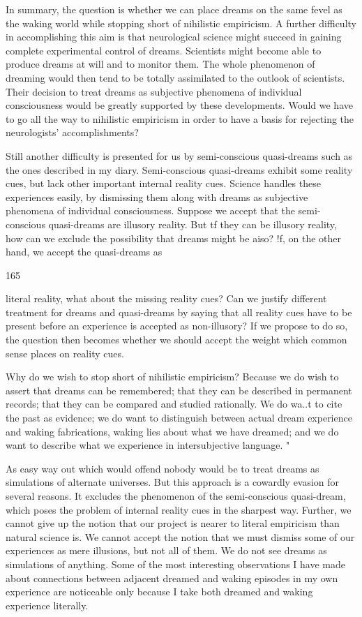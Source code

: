 \documentclass[10pt,twoside]{memoir}
\begin{document}
\begin{enumerate}
{{In summary, the question is whether we can place dreams on the same 
fevel as the waking world while stopping short of nihilistic empiricism. A 
further difficulty in accomplishing this aim is that neurological science might 
succeed in gaining complete experimental control of dreams. Scientists might 
become able to produce dreams at will and to monitor them. The whole 
phenomenon of dreaming would then tend to be totally assimilated to the 
outlook of scientists. Their decision to treat dreams as subjective phenomena 
of individual consciousness would be greatly supported by these 
developments. Would we have to go all the way to nihilistic empiricism in 
order to have a basis for rejecting the neurologists' accomplishments? 

Still another difficulty is presented for us by semi-conscious 
quasi-dreams such as the ones described in my diary. Semi-conscious 
quasi-dreams exhibit some reality cues, but lack other important internal 
reality cues. Science handles these experiences easily, by dismissing them 
along with dreams as subjective phenomena of individual consciousness. 
Suppose we accept that the semi-conscious quasi-dreams are illusory reality. 
But tf they can be illusory reality, how can we exclude the possibility that 
dreams might be aiso? !f, on the other hand, we accept the quasi-dreams as 


165 


literal reality, what about the missing reality cues? Can we justify different 
treatment for dreams and quasi-dreams by saying that all reality cues have to 
be present before an experience is accepted as non-illusory? If we propose 
to do so, the question then becomes whether we should accept the weight 
which common sense places on reality cues. 


Why do we wish to stop short of nihilistic empiricism? Because we do 
wish to assert that dreams can be remembered; that they can be described in 
permanent records; that they can be compared and studied rationally. We do 
wa..t to cite the past as evidence; we do want to distinguish between actual 
dream experience and waking fabrications, waking lies about what we have 
dreamed; and we do want to describe what we experience in intersubjective 
language. " 

As easy way out which would offend nobody would be to treat dreams 
as simulations of alternate universes. But this approach is a cowardly evasion 
for several reasons. It excludes the phenomenon of the semi-conscious 
quasi-dream, which poses the problem of internal reality cues in the sharpest 
way. Further, we cannot give up the notion that our project is nearer to 
literal empiricism than natural science is. We cannot accept the notion that 
we must dismiss some of our experiences as mere illusions, but not all of 
them. We do not see dreams as simulations of anything. Some of the most 
interesting observations I have made about connections between adjacent 
dreamed and waking episodes in my own experience are noticeable only 
because I take both dreamed and waking experience literally. 


}}
\end{enumerate}
\end{document}
